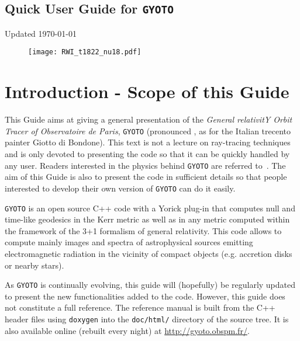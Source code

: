 \documentclass[a4paper,12pt]{article}
\begin{document}
\begin{center}
\section*{\Huge{Quick User Guide for \texttt{GYOTO}}}

\vspace{0.5cm}

\Large{Updated}
\today

\vspace{4cm}

\begin{figure}[htbp]
\centering
\texttt{[image: RWI\_t1822\_nu18.pdf]}
\end{figure}

\end{center}



\newpage

\section*{Introduction - Scope of this Guide}



This Guide aims at giving a general presentation of the \textit{General relativitY Orbit Tracer of Observatoire de Paris}, \texttt{GYOTO} (pronounced \textipa{[dZIoto]}, as for the Italian trecento painter Giotto di Bondone). This text is not a lecture on ray-tracing techniques and is only devoted to presenting the code so that it can be quickly handled by any user. Readers interested in the physics behind \texttt{GYOTO} are referred to~\citet[][and references therein]{vincent11a,vincent12a}. The aim of this Guide is also to present the code in sufficient details so that people interested to develop their own version of \texttt{GYOTO} can do it easily.

\texttt{GYOTO} is an open source C++ code with a Yorick plug-in that computes null and time-like geodesics in the Kerr metric as well as in any metric computed within the framework of the 3+1 formalism of general relativity. This code allows to compute mainly images and spectra of astrophysical sources emitting electromagnetic radiation in the vicinity of compact objects (e.g. accretion disks or nearby stars). 

As \texttt{GYOTO} is continually evolving, this guide will (hopefully) be regularly updated to present the new functionalities added to the code. However, this guide does not constitute a full reference. The reference manual is built from the C++ header files using \texttt{doxygen} into the \texttt{doc/html/} directory of the source tree. It is also available online (rebuilt every night) at \url{http://gyoto.obspm.fr/}.
\end{document}

